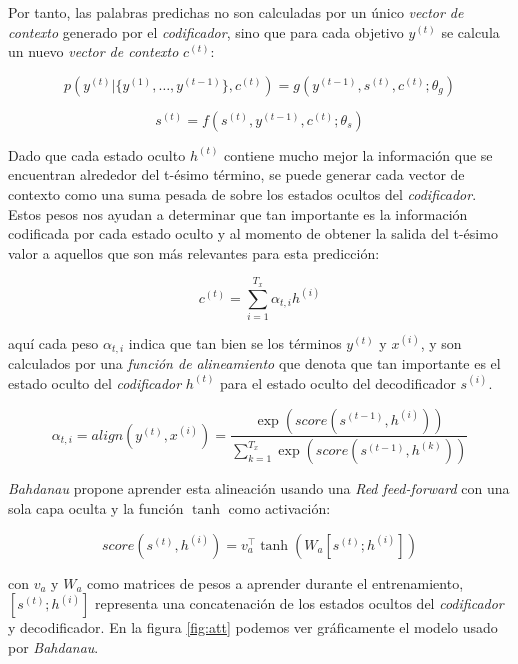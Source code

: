 Por tanto, las palabras predichas no son calculadas por un único \textit{vector de contexto} generado por
el \textit{codificador}, sino que para cada objetivo $y^{(t)}$ se calcula un nuevo \textit{vector de contexto} $c^{(t)}$:

\begin{equation}
    p(y^{(t)} | \{y^{(1)}, \dots , y^{(t-1)}\}, c^{(t)}) = g(y^{(t-1)}, s^{(t)}, c^{(t)}; \theta_g)
\end{equation}

\begin{equation}
    s^{(t)} = f(s^{(t)}, y^{(t-1)}, c^{(t)}; \theta_s)
\end{equation}

Dado que cada estado oculto $h^{(t)}$ contiene mucho mejor la información que se encuentran alrededor
del t-ésimo término, se puede generar cada vector de contexto como una suma pesada de sobre los
estados ocultos del \textit{codificador}. Estos pesos nos ayudan a determinar que tan importante es la
información codificada por cada estado oculto y al momento de obtener la salida del t-ésimo valor
 a aquellos que son más relevantes para esta predicción:

\begin{equation}
    c^{(t)} = \sum_{i=1}^{T_x} \alpha_{t,i} h^{(i)}
\end{equation}

aquí cada peso $\alpha_{t,i}$ indica que tan bien se  los términos $y^{(t)}$ y $x^{(i)}$,
y son calculados por una \textit{función de alineamiento} que denota que tan importante es el estado
oculto del \textit{codificador} $h^{(t)}$ para el estado oculto del decodificador $s^{(i)}$.

\begin{equation}
    \alpha_{t,i} = align(y^{(t)}, x^{(i)}) = \frac{\exp(score(s^{(t-1)}, h^{(i)}))}{\sum_{k=1}^{T_x} \exp(score(s^{(t-1)}, h^{(k)}))}
    \label{eq:b_align}
\end{equation}

\textit{Bahdanau} propone aprender esta alineación usando una \textit{Red feed-forward} con una sola
capa oculta y la función $\tanh$ como activación:

\begin{equation}
    score(s^{(t)}, h^{(i)}) = v^\top_a \tanh(W_a[s^{(t)};h^{(i)}])
    \label{eq:concat}
\end{equation}

con $v_a$ y $W_a$ como matrices de pesos a aprender durante el entrenamiento, $[s^{(t)};h^{(i)}]$
representa una concatenación de los estados ocultos del \textit{codificador} y decodificador. En la figura
\ref{fig:att} podemos ver gráficamente el modelo usado por \textit{Bahdanau}.

